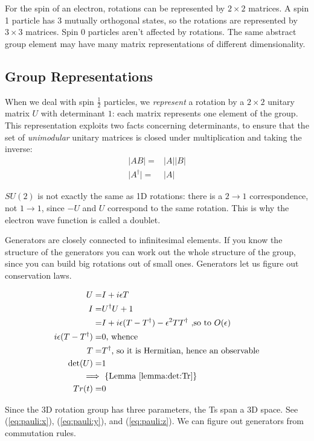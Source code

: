 \documentclass[]{article}
\begin{document}
For the spin of an electron, rotations can be represented by $2\times 2$ matrices. A spin 1 particle has 3 mutually orthogonal states, so the rotations are represented by $3\times 3$ matrices. Spin 0 particles aren't affected by rotations. The same abstract group element may have many matrix representations of different dimensionality.

\subsection{Group Representations}

When we deal with spin $\frac{1}{2}$ particles, we \emph{represent} a rotation by a $2\times 2$ unitary matrix $U$ with determinant $1$: each matrix represents one element of the group. This representation exploits two facts concerning determinants, to ensure that the set of \emph{unimodular} unitary matrices is closed under multiplication and taking the inverse:
\begin{align*}
	\lvert AB\rvert=&\lvert A\rvert\lvert B\rvert\\
	\lvert A^{\dagger}\rvert=&\lvert A\rvert
\end{align*}

$SU(2)$ is not exactly the same as 1D rotations: there is a $2\rightarrow1$ correspondence, not  $1\rightarrow1$, since $-U$ and $U$ correspond to the same rotation. This is why the electron wave function is called a doublet.

Generators are closely connected to infinitesimal elements. If you know the structure of the generators you can work out the whole structure of the group, since you can build big rotations out of small ones. Generators let us figure out conservation laws.

\begin{align*}
	U =& I + i \epsilon T\\
	I =& U^\dagger U + 1\\
	=& I + i\epsilon(T - T^\dagger) - \epsilon^2 T T^\dagger \text{ ,so to $O(\epsilon)$}\\
	i\epsilon(T - T^\dagger)=&0\text{, whence}\\
	T =& T^\dagger \text{, so it is Hermitian, hence an observable}\\
	\det(U) =& 1\\
	\implies&\text{ \{Lemma \ref{lemma:det:Tr}\}}\\
	Tr(t)=&0
\end{align*}

Since the 3D rotation group has three parameters, the Ts span a 3D space. See (\ref{eq:pauli:x}), (\ref{eq:pauli:y}), and (\ref{eq:pauli:z}). We can figure out generators from commutation rules.
\end{document}
